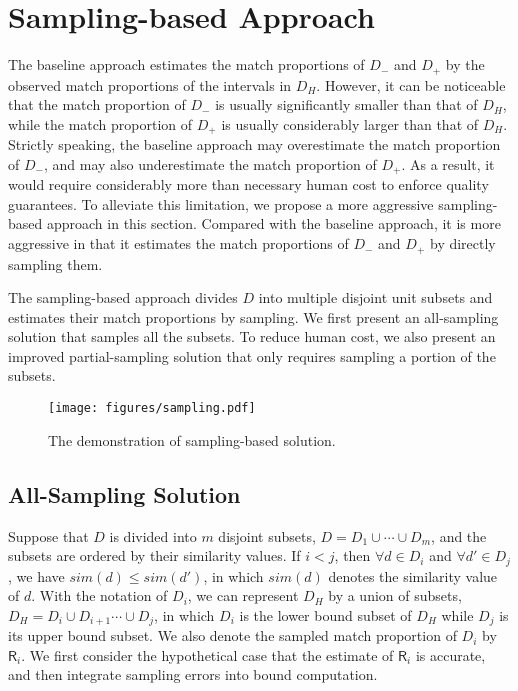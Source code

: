 \section{Sampling-based Approach} \label{sec:aggressive}

  The baseline approach estimates the match proportions of $D_-$ and $D_+$ by the observed match proportions of the intervals in $D_H$. However, it can be noticeable that the match proportion of $D_-$ is usually significantly smaller than that of $D_H$, while the match proportion of $D_+$ is usually considerably larger than that of $D_H$. Strictly speaking, the baseline approach may overestimate the match proportion of $D_-$, and may also underestimate the match proportion of $D_+$. As a result, it would require considerably more than necessary human cost to enforce quality guarantees. To alleviate this limitation, we propose a more aggressive sampling-based approach in this section. Compared with the baseline approach, it is more aggressive in that it estimates the match proportions of $D_-$ and $D_+$ by directly sampling them.

  The sampling-based approach divides $D$ into multiple disjoint unit subsets and estimates their match proportions by sampling. We first present an all-sampling solution that samples all the subsets. To reduce human cost, we also present an improved partial-sampling solution that only requires sampling a portion of the subsets.

\begin{figure}[!htb]
\setlength{\abovecaptionskip}{\figcaptionspace}
\centering
\texttt{[image: figures/sampling.pdf]}
\caption{The demonstration of sampling-based solution.}
\label{sampling_based_demonstration}
\end{figure}


\subsection{All-Sampling Solution} \label{sec:all-sampling}

   Suppose that $D$ is divided into $m$ disjoint subsets, $D=D_1\cup\cdots\cup D_m$, and the subsets are ordered by their similarity values. If $i<j$, then $\forall d\in D_i$ and $\forall d'\in D_j$, we have $sim(d)\leq sim(d')$, in which $sim(d)$ denotes the similarity value of $d$. With the notation of $D_i$, we can represent $D_H$ by a union of subsets, $D_H=D_i\cup D_{i+1}\cdots\cup D_j$, in which $D_i$ is the lower bound subset of $D_H$ while $D_j$ is its upper bound subset. We also denote the sampled match proportion of $D_i$ by $\mathsf{R}_i$. We first consider the hypothetical case that the estimate of $\mathsf{R}_i$ is accurate, and then integrate sampling errors into bound computation.

